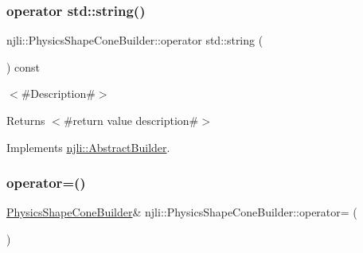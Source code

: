 \subsubsection{\texorpdfstring{operator std\+::string()}{operator std::string()}}
{\footnotesize\ttfamily njli\+::\+Physics\+Shape\+Cone\+Builder\+::operator std\+::string (\begin{DoxyParamCaption}{ }\end{DoxyParamCaption}) const\hspace{0.3cm}{\ttfamily [virtual]}}

$<$\#\+Description\#$>$

\begin{DoxyReturn}{Returns}
$<$\#return value description\#$>$ 
\end{DoxyReturn}


Implements \mbox{\hyperlink{classnjli_1_1_abstract_builder_a3e6e553e06d1ca30517ad5fb0bd4d000}{njli\+::\+Abstract\+Builder}}.

\mbox{\label{classnjli_1_1_physics_shape_cone_builder_a72b982131c1f57bb408cf650fb7fd637}} 
\subsubsection{\texorpdfstring{operator=()}{operator=()}}
{\footnotesize\ttfamily \mbox{\hyperlink{classnjli_1_1_physics_shape_cone_builder}{Physics\+Shape\+Cone\+Builder}}\& njli\+::\+Physics\+Shape\+Cone\+Builder\+::operator= (\begin{DoxyParamCaption}\item[{const \mbox{\hyperlink{classnjli_1_1_physics_shape_cone_builder}{Physics\+Shape\+Cone\+Builder}} \&}]{ }\end{DoxyParamCaption})\hspace{0.3cm}{\ttfamily [protected]}}

\mbox{\label{classnjli_1_1_physics_shape_cone_builder_a2a0376fd376d574255de19de5961acc0}} 
